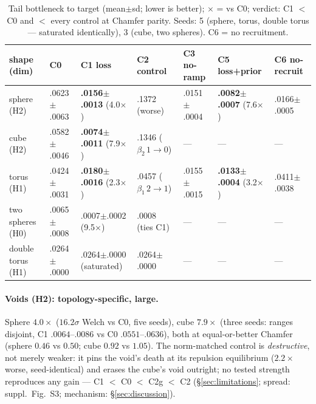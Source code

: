 \begin{table}[t]
\centering\small
\caption{Tail bottleneck to target (mean$\pm$sd; lower is better);
$\times$ = vs C0; verdict: C1 $<$ C0 and $<$ every control at Chamfer
parity. Seeds: 5 (sphere, torus, double torus --- saturated
identically), 3 (cube, two spheres). C6 = no recruitment.}
\label{tab:main}
\footnotesize
\setlength{\tabcolsep}{4pt}
\begin{tabular}{lllllll}
\toprule
shape (dim) & C0 & C1 loss & C2 control & C3 no-ramp & C5 loss+prior & C6 no-recruit \\
\midrule
sphere (H2)      & .0623$\pm$.0063 & \textbf{.0156$\pm$.0013} (4.0$\times$) & .1372 (worse) & .0151$\pm$.0004 & \textbf{.0082$\pm$.0007} (7.6$\times$) & .0166$\pm$.0005 \\
cube (H2)        & .0582$\pm$.0046 & \textbf{.0074$\pm$.0011} (7.9$\times$) & .1346 ($\beta_2\,1{\to}0$) & --- & --- & --- \\
torus (H1)       & .0424$\pm$.0031 & \textbf{.0180$\pm$.0016} (2.3$\times$) & .0457 ($\beta_1\,2{\to}1$) & .0155$\pm$.0015 & \textbf{.0133$\pm$.0004} (3.2$\times$) & .0411$\pm$.0038 \\
two spheres (H0)& .0065$\pm$.0008 & .0007$\pm$.0002 (9.5$\times$)          & .0008 (ties C1) & --- & --- & --- \\
double torus (H1)& .0264$\pm$.0000 & .0264$\pm$.0000 (saturated)           & .0264$\pm$.0000 & --- & --- & --- \\
\bottomrule
\end{tabular}
\end{table}

\paragraph{Voids (H2): topology-specific, large.} Sphere $4.0\times$
($16.2\sigma$ Welch vs C0, five seeds), cube $7.9\times$ (three seeds:
ranges disjoint, C1 $.0064$--$.0086$ vs C0 $.0551$--$.0636$), both at
equal-or-better Chamfer (sphere $0.46$ vs $0.50$; cube $0.92$ vs $1.05$).
The
norm-matched control is \emph{destructive}, not merely weaker: it pins
the void's death at its repulsion equilibrium ($2.2\times$ worse,
seed-identical) and erases the cube's void outright; no tested strength
reproduces any gain --- C1 $<$ C0 $<$ C2g $<$ C2
(\S\ref{sec:limitations}; spread: suppl.\ Fig.~S3; mechanism:
\S\ref{sec:discussion}).

